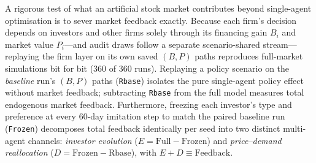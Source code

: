 \documentclass[11pt]{article}
\begin{document}
A rigorous test of what an artificial stock market contributes beyond single-agent optimisation is to sever market feedback exactly. Because each firm's decision depends on investors and other firms solely through its financing gain $B_i$ and market value $P_i$---and audit draws follow a separate scenario-shared stream---replaying the firm layer on its own saved $(B, P)$ paths reproduces full-market simulations bit for bit (360 of 360 runs). Replaying a policy scenario on the \emph{baseline} run's $(B, P)$ paths (\texttt{Rbase}) isolates the pure single-agent policy effect without market feedback; subtracting \texttt{Rbase} from the full model measures total endogenous market feedback. Furthermore, freezing each investor's type and preference at every 60-day imitation step to match the paired baseline run (\texttt{Frozen}) decomposes total feedback identically per seed into two distinct multi-agent channels: \emph{investor evolution} ($E = \text{Full} - \text{Frozen}$) and \emph{price--demand reallocation} ($D = \text{Frozen} - \text{Rbase}$), with $E + D \equiv \text{Feedback}$.
\end{document}
